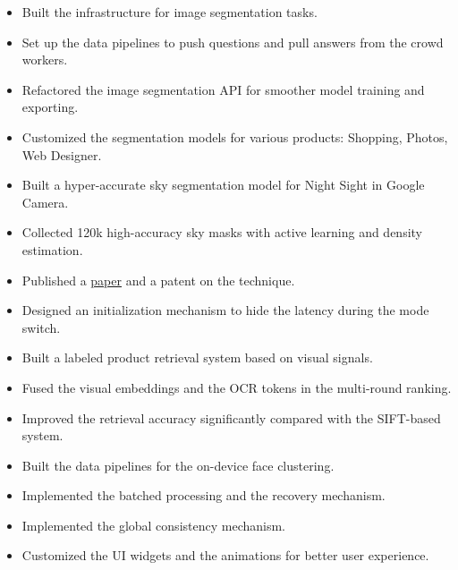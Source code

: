 \documentclass[letterpaper,11pt]{article}
\begin{document}
\begin{itemize}
  \begin{itemize}
  \item Built the infrastructure for image segmentation tasks.
  \item Set up the data pipelines to push questions and pull answers from the crowd workers.
  \item Refactored the image segmentation API for smoother model training and exporting.
  \item Customized the segmentation models for various products: Shopping, Photos, Web Designer.
  \end{itemize}
  \begin{itemize}
  \item Built a hyper-accurate sky segmentation model for Night Sight in Google Camera.
  \item Collected 120k high-accuracy sky masks with active learning and density estimation.
  \item Published a \href{https://google.github.io/sky-optimization/}{paper} and a patent on the technique.
  \item Designed an initialization mechanism to hide the latency during the mode switch.
  \end{itemize}
  \begin{itemize}
  \item Built a labeled product retrieval system based on visual signals.
  \item Fused the visual embeddings and the OCR tokens in the multi-round ranking.
  \item Improved the retrieval accuracy significantly compared with the SIFT-based system.
  \end{itemize}
  \begin{itemize}
  \item Built the data pipelines for the on-device face clustering.
  \item Implemented the batched processing and the recovery mechanism.
  \item Implemented the global consistency mechanism.
  \end{itemize}
  \begin{itemize}
  \item Customized the UI widgets and the animations for better user experience.
  \end{itemize}
\end{itemize}
\end{document}
